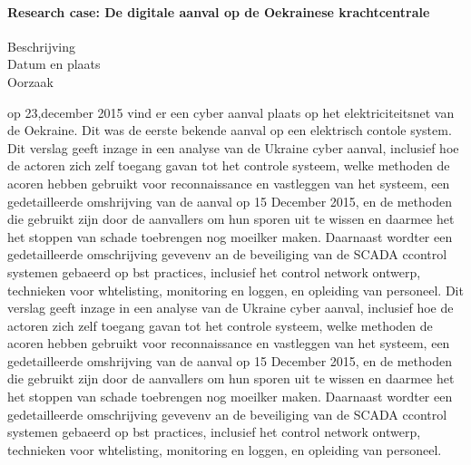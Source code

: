 \paragraph{ Research case: De digitale aanval op de Oekrainese krachtcentrale}

\begin{description}
\item[Beschrijving]
\item[Datum en plaats] 
\item[Oorzaak]
\end{description}

op 23,december 2015  vind er een cyber aanval plaats op het elektriciteitsnet van de Oekraine. Dit was de eerste bekende aanval op een elektrisch contole  system.  Dit verslag geeft inzage in een analyse van de Ukraine cyber aanval,
inclusief hoe de actoren zich zelf toegang gavan tot het controle systeem, welke methoden de acoren hebben gebruikt voor reconnaissance en vastleggen van het systeem, een gedetailleerde omshrijving van de aanval op 15 December 2015, en de methoden die gebruikt zijn door de aanvallers om hun sporen uit te wissen en daarmee het het stoppen van schade toebrengen  nog moeilker maken. Daarnaast wordter  een gedetailleerde omschrijving gevevenv an de beveiliging van de SCADA ccontrol systemen gebaeerd op bst practices, inclusief het control network ontwerp, technieken voor whtelisting, monitoring en loggen, en  opleiding van personeel.
\cite{Whitehead2017ukrainepoweroutage}
\cite{noauthor_2022-nm}
\cite{zetter2016GridHack}
\cite{owens21032017ukrainemitigationstrategies}
\cite{cerulus2019FrontlineRussiaAttack}
\cite{grammatikis2019AttackIEC6087505104}
\cite{hidajat2016ScadaSimulator}
\cite{uscert20072021crashmalware}
\cite{zetter12062017malwareanalysis}
\cite{icsRussianHackingCyberWeapon}
\cite{usgovC2M2}
Dit verslag geeft inzage in een analyse van de Ukraine cyber aanval,
inclusief hoe de actoren zich zelf toegang gavan tot het controle systeem, welke methoden de acoren hebben gebruikt voor reconnaissance en vastleggen van het systeem, een gedetailleerde omshrijving van de aanval op 15 December 2015, en de methoden die gebruikt zijn door de aanvallers om hun sporen uit te wissen en daarmee het het stoppen van schade toebrengen  nog moeilker maken. Daarnaast wordter  een gedetailleerde omschrijving gevevenv an de beveiliging van de SCADA ccontrol systemen gebaeerd op bst practices, inclusief het control network ontwerp, technieken voor whtelisting, monitoring en loggen, en  opleiding van personeel.
